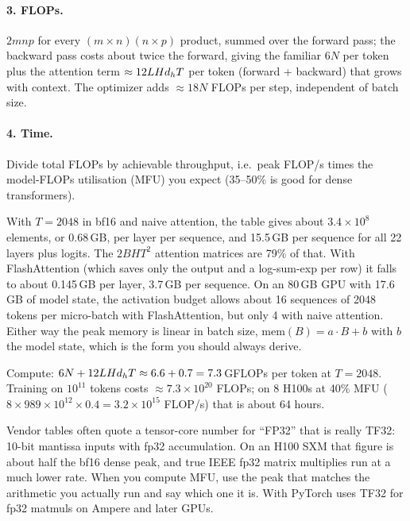 \paragraph{3. FLOPs.} $2mnp$ for every $(m\times n)(n\times p)$ product, summed over the forward
pass; the backward pass costs about twice the forward, giving the familiar $6N$ per token plus
the attention term $\approx 12 L H d_{h} T$ per token (forward + backward) that grows with
context. The optimizer adds $\approx18N$ FLOPs per step, independent of batch size.

\paragraph{4. Time.} Divide total FLOPs by achievable throughput, i.e.\ peak FLOP/s times the
model-FLOPs utilisation (MFU) you expect (35--50\% is good for dense transformers).

\begin{napkinmath}
With $T=2048$ in bf16 and naive attention, the table gives about $3.4\times10^8$ elements, or
0.68\,GB, per layer per sequence, and 15.5\,GB per sequence for all 22 layers plus logits. The
$2BHT^2$ attention matrices are 79\% of that. With FlashAttention (which saves only the output
and a log-sum-exp per row) it falls to about 0.145\,GB per layer, 3.7\,GB per sequence. On an
80\,GB GPU with 17.6\,GB of model state, the activation budget allows about 16 sequences of 2048
tokens per micro-batch with FlashAttention, but only 4 with naive attention. Either way the
peak memory is linear in batch size, $\text{mem}(B) = a\cdot B + b$ with $b$ the model state, which is the form you should always
derive.

Compute: $6N + 12LHd_{h} T \approx 6.6 + 0.7 = 7.3$\,GFLOPs per token at $T=2048$. Training on
$10^{11}$ tokens costs $\approx 7.3\times10^{20}$ FLOPs; on 8 H100s at 40\% MFU
($8\times 989\times10^{12}\times0.4 = 3.2\times10^{15}$ FLOP/s) that is about 64 hours.
\end{napkinmath}

\begin{pitfall}
Vendor tables often quote a tensor-core number for ``FP32'' that is really TF32: 10-bit
mantissa inputs with fp32 accumulation. On an H100 SXM that figure is about half the bf16 dense
peak, and true IEEE fp32 matrix multiplies run at a much lower rate. When you compute MFU, use
the peak that matches the arithmetic you actually run and say which one it is. With
 PyTorch uses TF32 for fp32 matmuls on Ampere
and later GPUs.
\end{pitfall}

